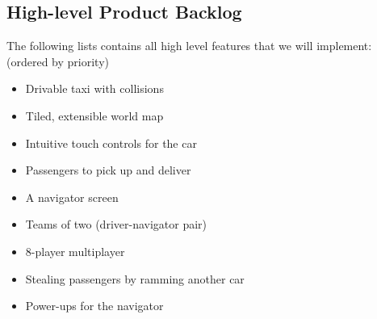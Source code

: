 \documentclass{article}
\begin{document}
\subsection{High-level Product Backlog}
The following lists contains all high level features that we will implement: (ordered  by priority)
\begin{itemize}
\item Drivable taxi with collisions
\item Tiled, extensible world map
\item Intuitive touch controls for the car
\item Passengers to pick up and deliver
\item A navigator screen
\item Teams of two (driver-navigator pair)
\item 8-player multiplayer
\item Stealing passengers by ramming another car
\item Power-ups for the navigator
\end{itemize}
\end{document}
